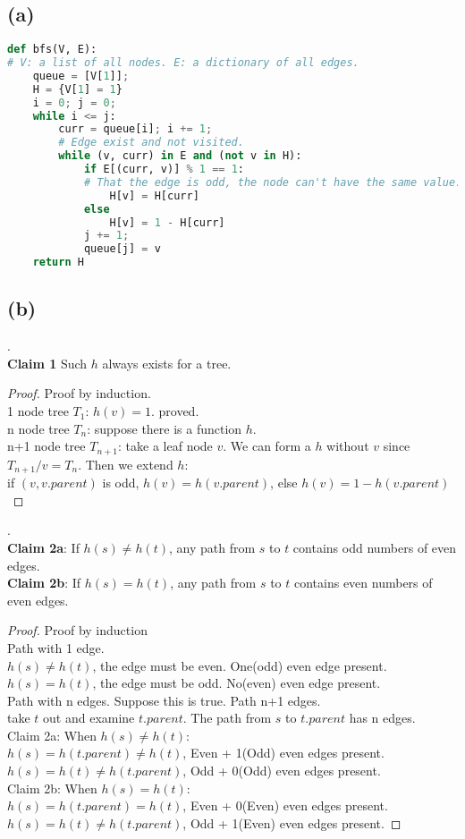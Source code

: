 \documentclass{article}
\begin{document}
\subsection*{(a)}
\begin{lstlisting}[language = python]
def bfs(V, E):
# V: a list of all nodes. E: a dictionary of all edges.
    queue = [V[1]];
    H = {V[1] = 1}
    i = 0; j = 0;
    while i <= j:
        curr = queue[i]; i += 1;
        # Edge exist and not visited.
        while (v, curr) in E and (not v in H):
            if E[(curr, v)] % 1 == 1:
            # That the edge is odd, the node can't have the same value.
                H[v] = H[curr]
            else
                H[v] = 1 - H[curr]
            j += 1;
            queue[j] = v
    return H
\end{lstlisting}
\subsection*{(b)}.\\
\textbf{Claim 1} Such $h$ always exists for a tree.
\begin{proof}
	Proof by induction.\\
	1 node tree $T_1$: $h(v) = 1$. proved.\\
	n node tree $T_n$: suppose there is a function $h$.\\
	n+1 node tree $T_{n+1}$: take a leaf node $v$. We can form a $h$ without $v$ since $T_{n+1}/v = T_{n}$. Then we extend $h$: \\
		if $(v, v.parent)$ is odd, $h(v) = h(v.parent)$, else $h(v) = 1 - h(v.parent)$
\end{proof}.\\
\textbf{Claim 2a}: If $h(s) \neq h(t)$, any path from $s$ to $t$ contains odd numbers of even edges.\\
\textbf{Claim 2b}: If $h(s) = h(t)$, any path from $s$ to $t$ contains even numbers of even edges.
\begin{proof}
	Proof by induction \\
	Path with 1 edge. \\
	$h(s) \neq h(t)$, the edge must be even. One(odd) even edge present. \\
	$h(s)   =  h(t)$, the edge must be odd. No(even) even edge present. \\
	Path with n edges. Suppose this is true.
	Path n+1 edges. \\
	take $t$ out and examine $t.parent$. The path from $s$ to $t.parent$ has n edges.\\
	Claim 2a: When $h(s) \neq h(t)$: \\
	$h(s) = h(t.parent) \neq h(t)$, Even + 1(Odd) even edges present.\\
	$h(s) = h(t) \neq h(t.parent)$, Odd + 0(Odd) even edges present.\\
	Claim 2b: When $h(s) = h(t)$: \\
	$h(s) = h(t.parent) = h(t)$, Even + 0(Even) even edges present.\\
	$h(s) = h(t) \neq h(t.parent) $, Odd + 1(Even) even edges present.
\end{proof}
\end{document}
